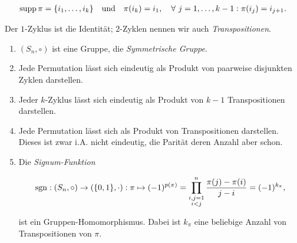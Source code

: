             \begin{align*}
                \operatorname{supp} \pi = {\left \{ i_1, \dots, i_k \right \}}
                \quad
                \text{und}
                \quad
                \pi(i_k) = i_1,
                \quad
                \forall ~ j = 1, \dots, k-1:
                    \pi(i_j) = i_{j+1}.
            \end{align*}

            Der $1$-Zyklus ist die Identität;
            $2$-Zyklen nennen wir auch \textit{Transpositionen}.


            \begin{lemma} \label{lem:permutations}

                \begin{enumerate}[
                    label = \arabic*.,
                    wide,
                    labelindent = 0pt
                ]

                    \item $(S_n, \circ)$ ist eine Gruppe, die \textit{Symmetrische Gruppe}.

                    \item Jede Permutation lässt sich eindeutig als Produkt von paarweise disjunkten Zyklen darstellen.

                    \item Jeder $k$-Zyklus lässt sich eindeutig als Produkt von $k-1$ Transpositionen darstellen.

                    \item Jede Permutation lässt sich als Produkt von Transpositionen darstellen.
                    Dieses ist zwar i.A. nicht eindeutig, die Parität deren Anzahl aber schon.

                    \item Die \textit{Signum-Funktion}

                    \begin{align*}
                        \operatorname{sgn}:
                            (S_n, \circ) \to ({\left \{ 0, 1 \right \}}, \cdot):
                            \pi
                            \mapsto
                            (-1)^{p(\pi)}
                            =
                            \prod_{\substack{i,j=1 \\ i<j}}^n
                                \frac{\pi(j) - \pi(i)}{j - i}
                            =
                            (-1)^{k_\pi},
                    \end{align*}

                    ist ein Gruppen-Homomorphismus.
                    Dabei ist $k_\pi$ eine beliebige Anzahl von Transpositionen von $\pi$.

                \end{enumerate}

            \end{lemma}

